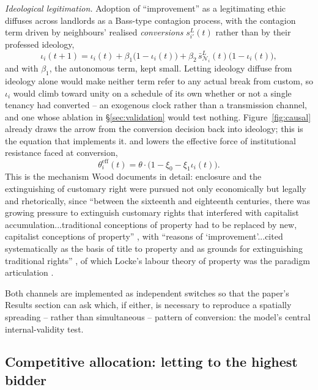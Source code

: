\documentclass[11pt,english]{article}
\begin{document}
\emph{Ideological legitimation.} Adoption of ``improvement'' as a legitimating ethic diffuses across landlords as a Bass-type contagion process, with the contagion term driven by neighbours' realised \emph{conversions} $s^{L}_{i'}(t)$ rather than by their professed ideology,
\begin{equation}
\iota_i(t+1) = \iota_i(t) + \beta_1\big(1-\iota_i(t)\big) + \beta_2\, \bar s^{L}_{\mathcal{N}_i}(t)\big(1-\iota_i(t)\big),
\end{equation}
and with $\beta_1$, the autonomous term, kept small. Letting ideology diffuse from ideology alone would make neither term refer to any actual break from custom, so $\iota_i$ would climb toward unity on a schedule of its own whether or not a single tenancy had converted -- an exogenous clock rather than a transmission channel, and one whose ablation in \S\ref{sec:validation} would test nothing. Figure~\ref{fig:causal} already draws the arrow from the conversion decision back into ideology; this is the equation that implements it.
and lowers the effective force of institutional resistance faced at conversion,
\begin{equation}
\theta_i^{\text{eff}}(t) = \theta\cdot\big(1-\xi_0-\xi_1\iota_i(t)\big).
\end{equation}
This is the mechanism Wood documents in detail: enclosure and the extinguishing of customary right were pursued not only economically but legally and rhetorically, since ``between the sixteenth and eighteenth centuries, there was growing pressure to extinguish customary rights that interfered with capitalist accumulation...traditional conceptions of property had to be replaced by new, capitalist conceptions of property'' \cite[p.108]{wood2002origin}, with ``reasons of `improvement'...cited systematically as the basis of title to property and as grounds for extinguishing traditional rights'' \cite[p.115]{wood2002origin}, of which Locke's labour theory of property was the paradigm articulation \cite[p.108-112]{wood2002origin}.

Both channels are implemented as independent switches so that the paper's Results section can ask which, if either, is necessary to reproduce a spatially spreading -- rather than simultaneous -- pattern of conversion: the model's central internal-validity test.

\subsection{Competitive allocation: letting to the highest bidder}
\label{sec:allocation}
\end{document}
